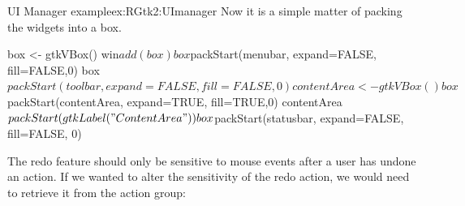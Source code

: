 \begin{example}{UI Manager example}{ex:RGtk2:UImanager}
Now it is a simple matter of packing the widgets into a box.
\begin{Schunk}
\begin{Sinput}
 box <- gtkVBox()
 win$add(box)
 box$packStart(menubar, expand=FALSE, fill=FALSE,0)
 box$packStart(toolbar, expand=FALSE, fill= FALSE,0)
 contentArea <- gtkVBox()
 box$packStart(contentArea, expand=TRUE, fill=TRUE,0)
 contentArea$packStart(gtkLabel("Content Area"))
 box$packStart(statusbar, expand=FALSE, fill=FALSE, 0)
\end{Sinput}
\end{Schunk}

The redo feature should only be sensitive to mouse events after a user
has undone an action. If we wanted to alter the sensitivity of the
redo action, we would need to retrieve it from the action group:
\begin{Schunk}
\end{Schunk}
\end{example}










